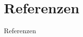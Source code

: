 \section{Referenzen}




\begin{frame}{Referenzen}
    \nocite{2021-egg}
    \nocite{devito}
    \printbibliography
\end{frame}